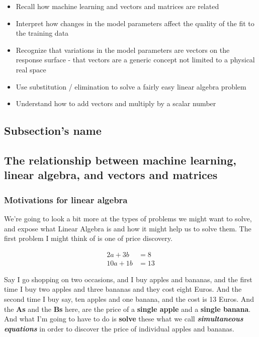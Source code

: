 \documentclass{article}
\begin{document}
\begin{itemize}
	\item Recall how machine learning and vectors and matrices are related
	\item Interpret how changes in the model parameters affect the quality of the fit to the training data
	\item Recognize that variations in the model parameters are vectors on the response surface - that vectors are a generic concept not limited to a physical real space
	\item Use substitution / elimination to solve a fairly easy linear algebra problem
	\item Understand how to add vectors and multiply by a scalar number
\end{itemize}

\subsection{Subsection's name}

\subsection{The relationship between machine learning, linear algebra, and vectors and matrices}

\subsubsection{Motivations for linear algebra}

We're going to look a bit more at the types of problems we might want to solve, and expose what Linear Algebra is and how it might help us to solve them.
The first problem I might think of is one of price discovery.

\begin{equation} \label{eq1}
\begin{split}
2a + 3b & = 8 \\
10a + 1b & = 13
\end{split}
\end{equation}

Say I go shopping on two occasions, and I buy apples and bananas, and the first time I buy two apples and three bananas and they cost eight Euros.
And the second time I buy say, ten apples and one banana, and the cost is 13 Euros.
And the \textbf{As} and the \textbf{Bs} here,
are the price of a \textbf{single apple} and a \textbf{single banana}.
And what I'm going to have to do is \textbf{solve} these what we call \textbf{\textit{simultaneous equations}} in order to discover the price of individual apples and bananas.
\end{document}
